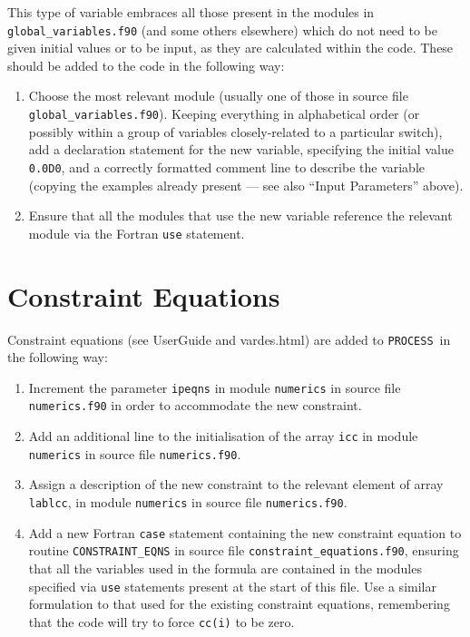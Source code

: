 \documentclass[11pt,a4paper]{report}
\newcommand{\process}{\mbox{\texttt{PROCESS}}}
\begin{document}
This type of variable embraces all those present in the modules in
\texttt{global\_variables.f90} (and some others elsewhere) which do not need
to be given initial values or to be input, as they are calculated within the
code. These should be added to the code in the following way:

\begin{enumerate}

\item Choose the most relevant module (usually one of those in source file
  \texttt{global\_variables.f90}). Keeping everything in alphabetical order
  (or possibly within a group of variables closely-related to a particular
  switch), add a declaration statement for the new variable, specifying the
  initial value \texttt{0.0D0}, and a correctly formatted comment line to
  describe the variable (copying the examples already present --- see also
  ``Input Parameters'' above).

\item Ensure that all the modules that use the new variable reference the
  relevant module via the Fortran \texttt{use} statement.

\end{enumerate}

\section{Constraint Equations}

Constraint equations (see UserGuide and vardes.html) are added to
\process\ in the following way:

\begin{enumerate}

\item Increment the parameter \texttt{ipeqns} in module \texttt{numerics} in
  source file \texttt{numerics.f90} in order to accommodate the new constraint.

\item Add an additional line to the initialisation of the array \texttt{icc}
  in module \texttt{numerics} in source file \texttt{numerics.f90}.

\item Assign a description of the new constraint to the relevant element of
  array \texttt{lablcc}, in module \texttt{numerics} in source file
  \texttt{numerics.f90}.

\item Add a new Fortran \texttt{case} statement containing the new constraint
  equation to routine \texttt{CONSTRAINT\_EQNS} in source file
  \texttt{constraint\_equations.f90}, ensuring that all the variables used in
  the formula are contained in the modules specified via \texttt{use}
  statements present at the start of this file.  Use a similar formulation to
  that used for the existing constraint equations, remembering that the code
  will try to force \texttt{cc(i)} to be zero.


\end{enumerate}
\end{document}
